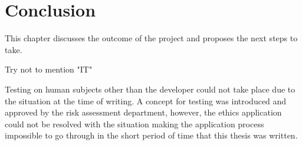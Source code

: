 \chapter{Conclusion} %

This chapter discusses the outcome of the project and proposes the next steps to take.

Try not to mention "IT"

Testing on human subjects other than the developer could not take place due to the situation at the time of writing. A concept for testing was introduced and approved by the risk assessment department, however, the ethics application could not be resolved with the situation making the application process impossible to go through in the short period of time that this thesis was written.
